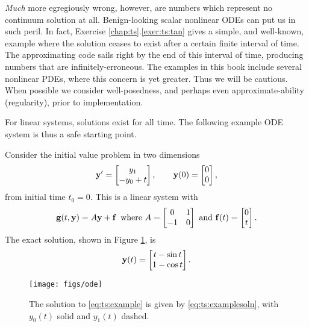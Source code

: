 \emph{Much} more egregiously wrong, however, are numbers which represent no continuum solution at all.  Benign-looking scalar nonlinear ODEs can put us in such peril.  In fact, Exercise \ref{chap:ts}.\ref{exer:ts:tan} gives a simple, and well-known, example where the solution ceases to exist after a certain finite interval of time.  The approximating code sails right by the end of this interval of time, producing numbers that are infinitely-erroneous.  The examples in this book include several nonlinear PDEs, where this concern is yet greater.  Thus we will be cautious.  When possible we consider well-posedness, and perhaps even approximate-ability (regularity), prior to implementation.

For linear systems, solutions exist for all time.  The following example ODE system is thus a safe starting point.

\noindent\hrulefill
\begin{example}  \label{ex:ts:odeeasy} Consider the initial value problem in two dimensions
\begin{equation}
   \mathbf{y}' = \begin{bmatrix} y_1 \\ - y_0 + t\end{bmatrix}, \qquad \mathbf{y}(0) = \begin{bmatrix} 0 \\ 0 \end{bmatrix}, \label{eq:ts:example}
\end{equation}
from initial time $t_0=0$.  This is a linear system with
    $$\mathbf{g}(t,\mathbf{y}) = A \mathbf{y} + \mathbf{f} \,\text{ where } A = \begin{bmatrix} 0 & 1 \\ -1 & 0 \end{bmatrix} \text{ and } \mathbf{f}(t) = \begin{bmatrix} 0 \\ t\end{bmatrix}.$$
The exact solution, shown in Figure \ref{fig:ts:ode}, is
\begin{equation}
    \mathbf{y}(t) = \begin{bmatrix} t - \sin t \\ 1 - \cos t \end{bmatrix}.\label{eq:ts:examplesoln}
\end{equation}

\vspace{-3mm}
\begin{figure}
\texttt{[image: figs/ode]}
\caption{The solution to \eqref{eq:ts:example} is given by \eqref{eq:ts:examplesoln}, with $y_0(t)$ solid and $y_1(t)$ dashed.}
\label{fig:ts:ode}
\end{figure}
\end{example}
\vspace{-5mm}
\noindent\hrulefill


